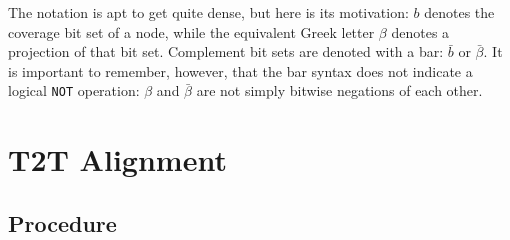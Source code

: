 \documentclass{article}
\begin{document}
\begin{itemize}
\end{itemize}

The notation is apt to get quite dense, but here is its motivation: $b$ denotes the coverage bit set of a node, while the equivalent Greek letter $\beta$ denotes a projection of that bit set.  Complement bit sets are denoted with a bar: $\bar{b}$ or $\bar{\beta}$.  It is important to remember, however, that the bar syntax does not indicate a logical {\tt NOT} operation: $\beta$ and $\bar{\beta}$ are not simply bitwise negations of each other.


\section{T2T Alignment}

\subsection{Procedure}
\end{document}
